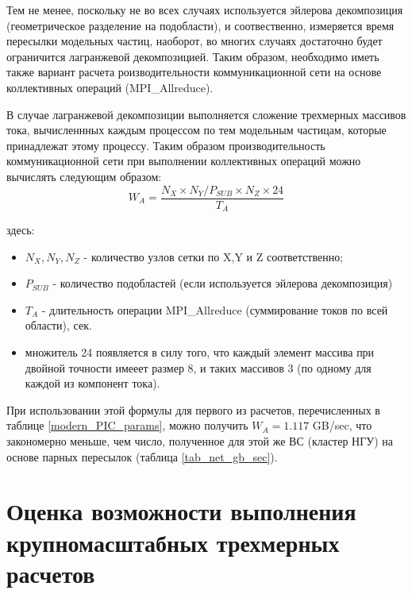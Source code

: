 \clearpage

Тем не менее, поскольку не во всех случаях используется эйлерова декомпозиция (геометрическое разделение на подобласти), и соотвественно, измеряется время пересылки модельных частиц, наоборот, во многих случаях достаточно будет ограничится лагранжевой декомпозицией. Таким образом, необходимо иметь также вариант расчета роизводительности коммуникационной сети на основе коллективных операций (MPI\_Allreduce).

В случае лагранжевой декомпозиции выполняется сложение трехмерных массивов тока, вычисленнных каждым процессом по тем модельным частицам, которые принадлежат этому процессу. Таким образом производительность коммуникационной сети при выполнении коллективных операций можно вычислять следующим образом:
\begin{equation}
W_A = \frac{N_X\times N_Y/P_{SUB} \times N_Z \times 24}{T_A}
\label{Net_performance_collective}
\end{equation}

здесь:
\begin{itemize}
	\item $N_X, N_Y, N_Z$ - количество узлов сетки по X,Y и Z соответственно;
	\item $P_{SUB}$ - количество подобластей (если используется эйлерова декомпозиция)
	\item $T_{A}$ - длительность операции MPI\_Allreduce (суммирование токов по всей области), сек.
	\item множитель 24 появляется в силу того, что каждый элемент массива при двойной точности имееет размер 8, и таких массивов 3 (по одному для каждой из компонент тока).
\end{itemize}	

При использовании этой формулы для первого из расчетов, перечисленных в таблице \ref{modern_PIC_params}, можно получить 
$W_A = 1.117$ GB/sec, что закономерно меньше, чем число, полученное для этой же ВС (кластер НГУ) на основе парных пересылок
(таблица \ref{tab_net_gb_sec}).





%		
%		

\section{Оценка возможности выполнения крупномасштабных трехмерных расчетов}
\label{Big3D}
















